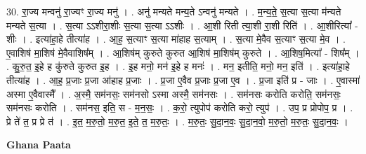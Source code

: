 \documentclass[17pt]{extarticle}
\begin{document}
30. रा॒ज्य मन्वनु॑ रा॒ज्यꣳ रा॒ज्य मनु॑ । . अनु॑ मन्यते मन्य॒ते ऽन्वनु॑ मन्यते । . म॒न्य॒ते॒ स॒त्या स॒त्या म॑न्यते मन्यते स॒त्या । . स॒त्या ऽऽशीरा॒शीः स॒त्या स॒त्या ऽऽशीः । . आ॒शी रिती त्या॒शी रा॒शी रिति॑ । . आ॒शीरित्या᳚ - शीः । . इत्या॑हा॒हे तीत्या॑ह । . आ॒ह॒ स॒त्याꣳ स॒त्या मा॑हाह स॒त्याम् । . स॒त्या मे॒वैव स॒त्याꣳ स॒त्या मे॒व । . ए॒वाशिष॑ मा॒शिष॑ मे॒वैवाशिष᳚म् । . आ॒शिष॑म् कुरुते कुरुत आ॒शिष॑ मा॒शिष॑म् कुरुते । . आ॒शिष॒मित्या᳚ - शिष᳚म् । . कु॒रु॒त॒ इ॒हे ह कु॑रुते कुरुत इ॒ह । . इ॒ह मनो॒ मन॑ इ॒हे ह मनः॑ । . मन॒ इतीति॒ मनो॒ मन॒ इति॑ । . इत्या॑हा॒हे तीत्या॑ह । . आ॒ह॒ प्र॒जाः प्र॒जा आ॑हाह प्र॒जाः । . प्र॒जा ए॒वैव प्र॒जाः प्र॒जा ए॒व । . प्र॒जा इति॑ प्र - जाः । . ए॒वास्मा॑ अस्मा ए॒वैवास्मै᳚ । . अ॒स्मै॒ सम॑नसः॒ सम॑नसो ऽस्मा अस्मै॒ सम॑नसः । . सम॑नसः करोति करोति॒ सम॑नसः॒ सम॑नसः करोति । . सम॑नस॒ इति॒ स - म॒न॒सः॒ । . क॒रो॒ त्युपोप॑ करोति करो॒ त्युप॑ । . उप॒ प्र प्रोपोप॒ प्र । . प्रे ते॑ त॒ प्र प्रे त॑ । . इ॒त॒ म॒रु॒तो॒ म॒रु॒त॒ इ॒ते॒ त॒ म॒रु॒तः॒ । . म॒रु॒तः॒ सु॒दा॒न॒वः॒ सु॒दा॒न॒वो॒ म॒रु॒तो॒ म॒रु॒तः॒ सु॒दा॒न॒वः॒ । \newline

\textbf{Ghana Paata } \newline
\end{document}

